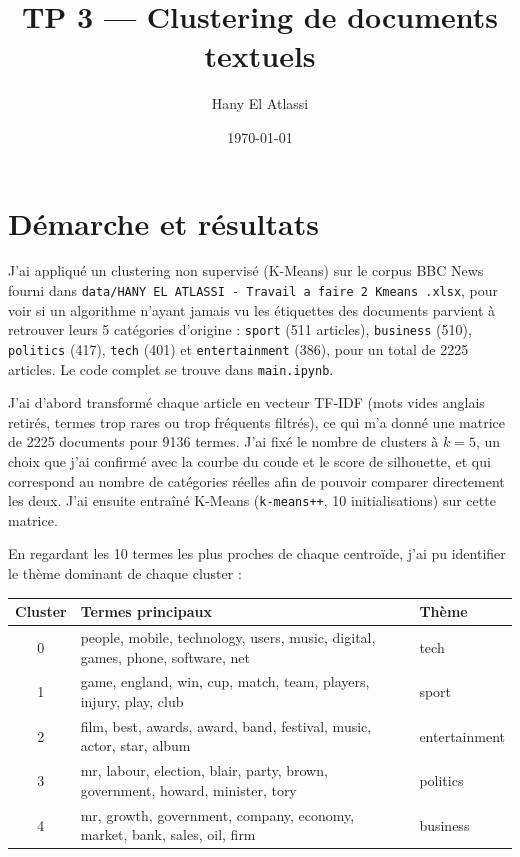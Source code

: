 \documentclass[11pt,a4paper]{article}
\title{TP 3 --- Clustering de documents textuels}
\author{Hany El Atlassi}
\date{\today}
\begin{document}
\maketitle

\section{Démarche et résultats}

J'ai appliqué un clustering non supervisé (K-Means) sur le corpus BBC News
fourni dans \texttt{data/HANY EL ATLASSI - Travail a faire 2 Kmeans .xlsx},
pour voir si un algorithme n'ayant jamais vu les étiquettes des documents
parvient à retrouver leurs 5 catégories d'origine : \texttt{sport} (511
articles), \texttt{business} (510), \texttt{politics} (417), \texttt{tech}
(401) et \texttt{entertainment} (386), pour un total de 2225 articles. Le
code complet se trouve dans \texttt{main.ipynb}.

J'ai d'abord transformé chaque article en vecteur TF-IDF (mots vides
anglais retirés, termes trop rares ou trop fréquents filtrés), ce qui m'a
donné une matrice de 2225 documents pour 9136 termes. J'ai fixé le nombre
de clusters à $k=5$, un choix que j'ai confirmé avec la courbe du coude et
le score de silhouette, et qui correspond au nombre de catégories réelles
afin de pouvoir comparer directement les deux. J'ai ensuite entraîné
K-Means (\texttt{k-means++}, 10 initialisations) sur cette matrice.

En regardant les 10 termes les plus proches de chaque centroïde, j'ai pu
identifier le thème dominant de chaque cluster :

\begin{table}[h]
\centering
\small
\begin{tabular}{cll}
\toprule
Cluster & Termes principaux & Thème \\
\midrule
0 & people, mobile, technology, users, music, digital, games, phone, software, net & tech \\
1 & game, england, win, cup, match, team, players, injury, play, club & sport \\
2 & film, best, awards, award, band, festival, music, actor, star, album & entertainment \\
3 & mr, labour, election, blair, party, brown, government, howard, minister, tory & politics \\
4 & mr, growth, government, company, economy, market, bank, sales, oil, firm & business \\
\bottomrule
\end{tabular}
\end{table}
\end{document}
